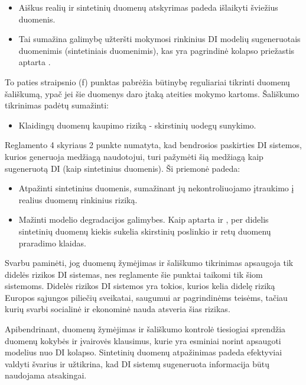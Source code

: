 \documentclass{VUMIFInfKursinis}
\begin{document}
\begin{itemize}
    \item Aiškus realių ir sintetinių duomenų atskyrimas padeda išlaikyti šviežius duomenis.
    \item Tai sumažina galimybę užteršti mokymosi rinkinius DI modelių sugeneruotais duomenimis (sintetiniais duomenimis), kas yra pagrindinė kolapso priežastis aptarta \cite{ModelsGoMAD}.
\end{itemize}

To paties straipsnio (f) punktas pabrėžia būtinybę reguliariai tikrinti duomenų šališkumą, ypač jei šie duomenys daro įtaką ateities mokymo kartoms. Šališkumo tikrinimas padėtų sumažinti:

\begin{itemize}
    \item  Klaidingų duomenų kaupimo riziką - skirstinių uodegų sunykimo.
\end{itemize}

Reglamento 4 skyriaus 2 punkte numatyta, kad bendrosios paskirties DI sistemos, kurios generuoja medžiagą naudotojui, turi pažymėti šią medžiagą kaip sugeneruotą DI (kaip sintetinius duomenis). Ši priemonė padeda:

\begin{itemize}
    \item Atpažinti sintetinius duomenis, sumažinant jų nekontroliuojamo įtraukimo į realius duomenų rinkinius riziką.
    \item Mažinti modelio degradacijos galimybes. Kaip aptarta \cite{AICollapseNature} ir \cite{DesniuPasiulymai}, per didelis sintetinių duomenų kiekis sukelia skirstinių poslinkio ir retų duomenų praradimo klaidas.
\end{itemize}

Svarbu paminėti, jog duomenų žymėjimas ir šališkumo tikrinimas apsaugoja tik didelės rizikos DI sistemas, nes reglamente šie punktai taikomi tik šiom sistemoms. Didelės rizikos DI sistemos yra tokios, kurios kelia didelę riziką Europos sąjungos piliečių sveikatai, saugumui ar pagrindinėms teisėms, tačiau kurių svarbi socialinė ir ekonominė nauda atsveria šias rizikas.

Apibendrinant, duomenų žymėjimas ir šališkumo kontrolė tiesiogiai sprendžia duomenų kokybės ir įvairovės klausimus, kurie yra esminiai norint apsaugoti modelius nuo DI kolapso. Sintetinių duomenų atpažinimas padeda efektyviai valdyti švarius ir užtikrina, kad DI sistemų sugeneruota informacija būtų naudojama atsakingai.
\end{document}
